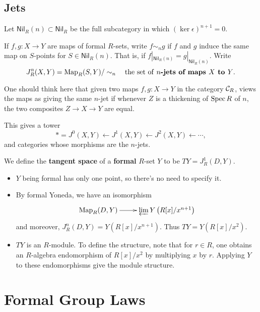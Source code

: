 \documentclass[11pt]{article}
\newcommand{\RNil}{\mathsf{Nil}_R}
\begin{document}
\subsection{Jets}
\begin{itemise}
\setlength{\parindent}{.25in}
\item Let $\RNil(n)\subset \RNil$ be the full subcategory in which $(\ker\epsilon)^{n+1}=0$.
\item If $f,g:X\to Y$ are maps of formal $R$-sets, write $f\sim_n g$ if $f$ and $g$ induce the same map on $S$-points for $S\in\RNil(n)$. That is, if $f|_{\RNil(n)}=g|_{\RNil(n)}$. Write
\[J^n_R(X,Y)=\operatorname{Map}_R(S,Y)/\sim_n\textup{\quad the set of \textbf{$n$-jets of maps $X$ to $Y$}.}\]
\begin{shaded}
One should think here that given two maps $f,g:X\to Y$ in the category $\mathcal{C}_R$, views the maps as giving the same $n$-jet if whenever $Z$ is a thickening of $\operatorname{Spec} R$ of  $n$, the two composites $Z\to X\to Y$ are equal.
\end{shaded}
This gives a tower
\[\ast=J^0(X,Y)\leftarrow J^1(X,Y)\leftarrow J^2(X,Y)\leftarrow\cdots, \]
and categories whose morphisms are the $n$-jets.
\item We define the \textbf{tangent space} of a \textbf{formal} $R$-set $Y$ to be $TY=J_R^1(D,Y)$.
\begin{itemize}\squishlist
\setlength{\parindent}{.25in}
\item $Y$ being formal has only one point, so there's no need to specify it.
\item By formal Yoneda, we have an isomorphism
\[\xymatrix@R=0mm{
\ar[r]^-{}%
\Map_R(D,Y)&%
\varprojlim Y\left(R[x]/x^{n+1}\right)
}\]
and moreover, $J^n_R(D,Y)=Y(R[x]/x^{n+1})$. Thus
$TY= Y(R[x]/x^2)$.
\item $TY$ is an $R$-module. To define the structure, note that for $r\in R$, one obtains an $R$-algebra endomorphism of $R[x]/x^2$ by multiplying $x$ by $r$. Applying $Y$ to these endomorphisms give the module structure.
\end{itemize}
\end{itemise}
\section{Formal Group Laws}
\end{document}
